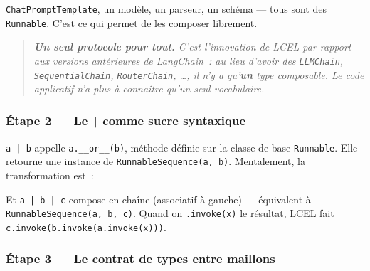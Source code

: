\documentclass[11pt,a4paper]{article}
\begin{document}
\texttt{ChatPromptTemplate}, un modèle, un parseur, un schéma — tous sont
des \texttt{Runnable}. C'est ce qui permet de les composer librement.

\begin{quote}\itshape
\textbf{Un seul protocole pour tout.} C'est l'innovation de LCEL par
rapport aux versions antérieures de LangChain~: au lieu d'avoir des
\texttt{LLMChain}, \texttt{SequentialChain}, \texttt{RouterChain},
\dots, il n'y a qu'\textbf{un} type composable. Le code applicatif n'a plus
à connaître qu'un seul vocabulaire.
\end{quote}

\subsubsection*{Étape 2 — Le \texttt{|} comme sucre syntaxique}

\texttt{a | b} appelle \texttt{a.\_\_or\_\_(b)}, méthode définie sur la
classe de base \texttt{Runnable}. Elle retourne une instance de
\texttt{RunnableSequence(a, b)}. Mentalement, la transformation est~:

\begin{center}
\end{center}

Et \texttt{a | b | c} compose en chaîne (associatif à gauche) — équivalent
à \texttt{RunnableSequence(a, b, c)}. Quand on \texttt{.invoke(x)} le
résultat, LCEL fait \texttt{c.invoke(b.invoke(a.invoke(x)))}.

\subsubsection*{Étape 3 — Le contrat de types entre maillons}

\begin{center}
\end{center}
\end{document}
